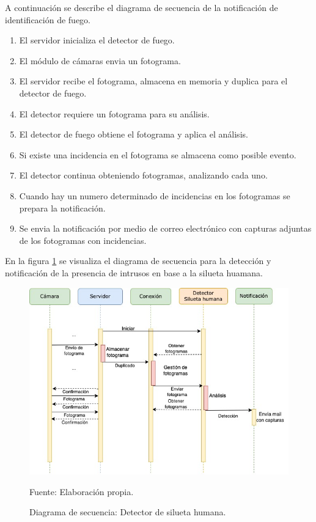 A continuación se describe el diagrama de secuencia de la notificación de identificación de fuego.\\
\begin{enumerate}
    \item El servidor inicializa el detector de fuego.
    \item El módulo de cámaras envia un fotograma.    
    \item El servidor recibe el fotograma, almacena en memoria y duplica para el detector de fuego.
    \item El detector requiere un fotograma para su análisis.
    \item El detector de fuego obtiene el fotograma y aplica el análisis.
    \item Si existe una incidencia en el fotograma se almacena como posible evento. 
    \item El detector continua obteniendo fotogramas, analizando cada uno.
    \item Cuando hay un numero determinado de incidencias en los fotogramas se prepara la notificación.
    \item Se envia la notificación por medio de correo electrónico con capturas adjuntas de los fotogramas con incidencias.
\end{enumerate}

En la figura \ref{fig:diag_sec_dec_human} se visualiza el diagrama de secuencia para la detección y notificación de la presencia de intrusos en base a la silueta huamana.

\begin{figure}[H]
    \begin{center}
        \includegraphics[width=14cm]{img/capitulo_4/human_detection.jpg}
    \end{center}
    \begin{center}
        \caption{Diagrama de secuencia: Detector de silueta humana.}
        Fuente: Elaboración propia.
        \label{fig:diag_sec_dec_human}
    \end{center}
\end{figure}


